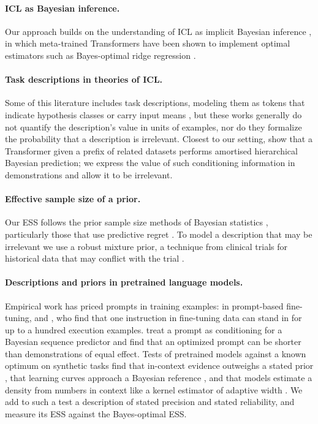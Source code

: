 \documentclass{article}
\begin{document}
\paragraph{ICL as Bayesian inference.} Our approach builds on the understanding of ICL as implicit Bayesian inference \citep{xie2022}, in which meta-trained Transformers have been shown to implement optimal estimators such as Bayes-optimal ridge regression \citep{akyurek2023, raventos2023, panwar2024}.

\paragraph{Task descriptions in theories of ICL.} Some of this literature includes task descriptions, modeling them as tokens that indicate hypothesis classes or carry input means \citep{huangge2025, lin2025, tong2026, lin2024}, but these works generally do not quantify the description's value in units of examples, nor do they formalize the probability that a description is irrelevant. Closest to our setting, \citet{zhu2026} show that a Transformer given a prefix of related datasets performs amortised hierarchical Bayesian prediction; we express the value of such conditioning information in demonstrations and allow it to be irrelevant.

\paragraph{Effective sample size of a prior.} Our ESS follows the prior sample size methods of Bayesian statistics \citep{morita2008, reimherr2021, neuenschwander2020}, particularly those that use predictive regret \citep{reznik2026}. To model a description that may be irrelevant we use a robust mixture prior, a technique from clinical trials for historical data that may conflict with the trial \citep{schmidli2014}.

\paragraph{Descriptions and priors in pretrained language models.} Empirical work has priced prompts in training examples: \citet{lescao2021} in prompt-based fine-tuning, and \citet{cook2026}, who find that one instruction in fine-tuning data can stand in for up to a hundred execution examples. \citet{wenliang2025} treat a prompt as conditioning for a Bayesian sequence predictor and find that an optimized prompt can be shorter than demonstrations of equal effect. Tests of pretrained models against a known optimum on synthetic tasks find that in-context evidence outweighs a stated prior \citep{gupta2025}, that learning curves approach a Bayesian reference \citep{akata2026}, and that models estimate a density from numbers in context like a kernel estimator of adaptive width \citep{liu2025}. We add to such a test a description of stated precision and stated reliability, and measure its ESS against the Bayes-optimal ESS.
\end{document}
